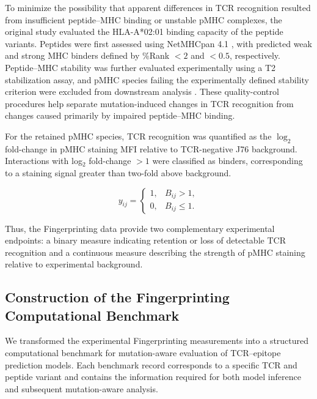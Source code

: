 To minimize the possibility that apparent differences in TCR recognition resulted from insufficient peptide--MHC binding or unstable pMHC complexes, the original study evaluated the HLA-A*02:01 binding capacity of the peptide
variants. Peptides were first assessed using NetMHCpan 4.1 \cite{reynisson20}, with predicted weak and strong MHC binders defined by \%Rank $<2$ and $<0.5$, respectively. Peptide--MHC stability was further evaluated experimentally using a T2 stabilization assay, and pMHC species failing the experimentally defined
stability criterion were excluded from downstream analysis \cite{malone2025fingerprinting}. These quality-control procedures help separate mutation-induced changes in TCR recognition from changes caused
primarily by impaired peptide--MHC binding.

For the retained pMHC species, TCR recognition was quantified as the $\log_2$ fold-change in pMHC staining MFI relative to TCR-negative J76 background. Interactions with log$_2$ fold-change $>1$ were classified as binders, corresponding to a staining signal greater than two-fold above
background.

\begin{equation}
y_{ij} =
\begin{cases}
1, & B_{ij} > 1,\\
0, & B_{ij} \leq 1.
\end{cases}
\label{eq:binary_label}
\end{equation}


Thus, the Fingerprinting data provide two complementary experimental endpoints: a binary measure indicating retention or loss of detectable TCR recognition and a continuous measure describing the strength of pMHC 
staining relative to experimental background.


\subsection{Construction of the Fingerprinting Computational Benchmark}

We transformed the experimental Fingerprinting measurements into a structured computational benchmark for mutation-aware evaluation of TCR--epitope prediction models. Each benchmark record corresponds to a 
specific TCR and peptide variant and contains the information required for both model inference and subsequent mutation-aware analysis. 

